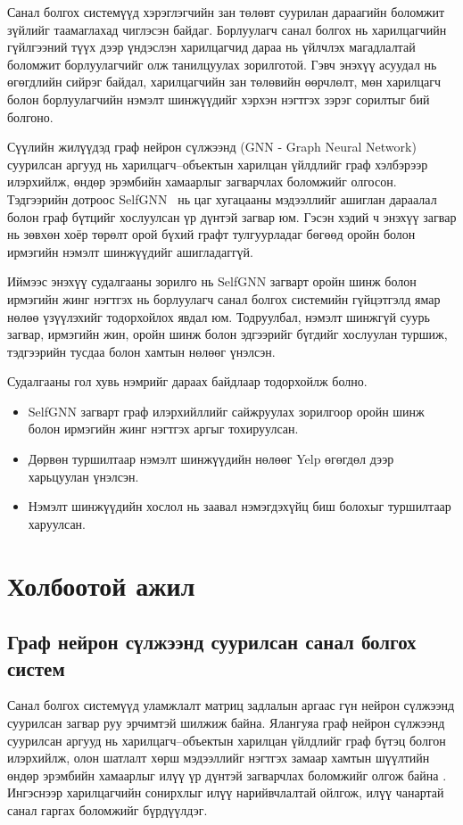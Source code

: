 \documentclass[conference]{IEEEtran}
\begin{document}
Санал болгох системүүд хэрэглэгчийн зан төлөвт суурилан дараагийн боломжит зүйлийг таамаглахад чиглэсэн байдаг. Борлуулагч санал болгох нь харилцагчийн гүйлгээний түүх дээр үндэслэн харилцагчид дараа нь үйлчлэх магадлалтай боломжит борлуулагчийг олж танилцуулах зорилготой. Гэвч энэхүү асуудал нь өгөгдлийн сийрэг байдал, харилцагчийн зан төлөвийн өөрчлөлт, мөн харилцагч болон борлуулагчийн нэмэлт шинжүүдийг хэрхэн нэгтгэх зэрэг сорилтыг бий болгоно.

Сүүлийн жилүүдэд граф нейрон сүлжээнд (GNN - Graph Neural Network) суурилсан аргууд нь харилцагч–объектын харилцан үйлдлийг граф хэлбэрээр илэрхийлж, өндөр эрэмбийн хамаарлыг загварчлах боломжийг олгосон. Тэдгээрийн дотроос SelfGNN~\cite{selfgnn2024} нь цаг хугацааны мэдээллийг ашиглан дараалал болон граф бүтцийг хослуулсан үр дүнтэй загвар юм. Гэсэн хэдий ч энэхүү загвар нь зөвхөн хоёр төрөлт орой бүхий графт тулгуурладаг бөгөөд оройн болон ирмэгийн нэмэлт шинжүүдийг ашигладаггүй.

Иймээс энэхүү судалгааны зорилго нь SelfGNN загварт оройн шинж болон ирмэгийн жинг нэгтгэх нь борлуулагч санал болгох системийн гүйцэтгэлд ямар нөлөө үзүүлэхийг тодорхойлох явдал юм. Тодруулбал, нэмэлт шинжгүй суурь загвар, ирмэгийн жин, оройн шинж болон эдгээрийг бүгдийг хослуулан туршиж, тэдгээрийн тусдаа болон хамтын нөлөөг үнэлсэн.

Судалгааны гол хувь нэмрийг дараах байдлаар тодорхойлж болно.
\begin{itemize}
    \item SelfGNN загварт граф илэрхийллийг сайжруулах зорилгоор оройн шинж болон ирмэгийн жинг нэгтгэх аргыг тохируулсан.
    \item Дөрвөн туршилтаар нэмэлт шинжүүдийн нөлөөг Yelp өгөгдөл дээр харьцуулан үнэлсэн.
    \item Нэмэлт шинжүүдийн хослол нь заавал нэмэгдэхүйц биш болохыг туршилтаар харуулсан.
\end{itemize}

\section{Холбоотой ажил}

\subsection{Граф нейрон сүлжээнд суурилсан санал болгох систем}

Санал болгох системүүд уламжлалт матриц задлалын аргаас гүн нейрон сүлжээнд суурилсан загвар руу эрчимтэй шилжиж байна. Ялангуяа граф нейрон сүлжээнд суурилсан аргууд нь харилцагч–объектын харилцан үйлдлийг граф бүтэц болгон илэрхийлж, олон шатлалт хөрш мэдээллийг нэгтгэх замаар хамтын шүүлтийн өндөр эрэмбийн хамаарлыг илүү үр дүнтэй загварчлах боломжийг олгож байна \cite{gao2023survey}. Ингэснээр харилцагчийн сонирхлыг илүү нарийвчлалтай ойлгож, илүү чанартай санал гаргах боломжийг бүрдүүлдэг. 
\end{document}
